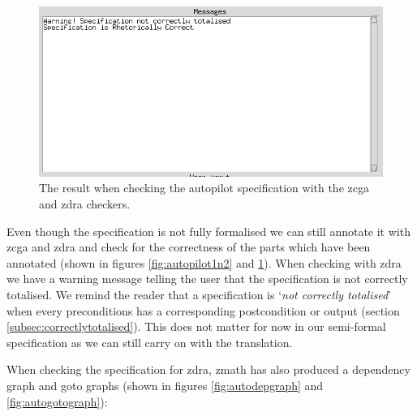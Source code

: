 \begin{figure}[H]
\begin{minipage}{0.45\textwidth}
\includegraphics[clip, trim=0cm 8.5cm 9cm 0cm, scale=0.5]{examples/semiform/zdracorrect.png}
\vspace{-0.2in}
\caption{The result when checking the autopilot specification with the \gls{zcga} and \gls{zdra} checkers. \label{fig:autopilotcorrect}}
\vspace{-0.2in}
\end{minipage}
\end{figure}

Even though the specification is not fully formalised we can still annotate it
with \gls{zcga} and \gls{zdra} and check for the correctness of the parts which
have been annotated (shown in figures \ref{fig:autopilot1n2} and
\ref{fig:autopilotcorrect}). When checking with \gls{zdra} we have a warning
message telling the user that the specification is not correctly totalised.
We remind the reader that a specification is `\textit{not correctly totalised}' when 
every preconditions has a corresponding postcondition or output (section \ref{subsec:correctlytotalised}). 
This does not matter for now in our semi-formal specification
as we can still carry on with the translation.

When checking the specification for \gls{zdra}, \gls{zmath} has also produced a
dependency graph and goto graphs (shown in figures \ref{fig:autodepgraph} and
\ref{fig:autogotograph}):

